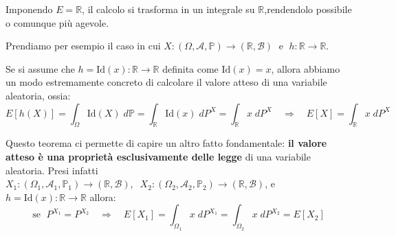 \medskip
\noindent Imponendo $E = \mathbb{R}$, il calcolo si trasforma in un integrale su $\mathbb{R}$,rendendolo possibile o comunque più agevole.
\begin{esempio}
    Prendiamo per esempio il caso in cui $X:(\Omega, \mathcal{A}, \mathbb{P})\to(\mathbb{R}, \mathcal{B})\;$ e $\;h:\mathbb{R}\to\mathbb{R}$.

\begin{figure}[H]
\centering
{}
\end{figure}
\end{esempio}

\bigskip
\noindent Se si assume che $h=\text{Id}(x):\mathbb{R}\to\mathbb{R}$ definita come $\text{Id}(x) = x$, allora abbiamo un modo estremamente concreto di calcolare il valore atteso di una variabile aleatoria, ossia:
\[E[h(X)] = \int_\Omega \text{Id}(X)\;d\mathbb{P} = \int_\mathbb{R} \text{Id}(x) \;dP^X = \int_\mathbb{R} x \;dP^X\quad \Rightarrow \quad \boxed{E[X] = \int_\mathbb{R}x\;dP^X}\]

\bigskip
\noindent Questo teorema ci permette di capire un altro fatto fondamentale: \textbf{il valore atteso è una proprietà esclusivamente delle legge} di una variabile aleatoria. Presi infatti $X_1:(\Omega_1, \mathcal{A}_1, \mathbb{P}_1)\to(\mathbb{R}, \mathcal{B}), \;\;X_2:(\Omega_2, \mathcal{A}_2, \mathbb{P}_2)\to(\mathbb{R}, \mathcal{B})$, e $h = \text{Id}(x):\mathbb{R}\to\mathbb{R}$ allora:
\[\text{se }\; P^{X_1} = P^{X_2} \quad \Rightarrow \quad E[X_1] = \int_{\Omega_1} x\;dP^{X_1} = \int_{\Omega_2} x\;dP^{X_2} = E[X_2]\]




